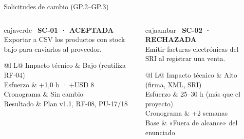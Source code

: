 \documentclass[aspectratio=169,11pt]{beamer}
\newcommand{\si}{\textcolor{verdeespe}{\ding{51}}}
\newcommand{\no}{\textcolor{rojo}{\ding{55}}}
\newcommand{\caja}[3]{\begin{beamercolorbox}[wd=\dimexpr\linewidth-12pt\relax,sep=6pt,rounded=true]{#1}#3\end{beamercolorbox}}
\begin{document}
\begin{frame}{Solicitudes de cambio (GP.2–GP.3)}
\begin{columns}[T,onlytextwidth]
\caja{cajaverde}{}{%
{\large\si}\ \textbf{SC-01 · ACEPTADA}\\[0.1cm]
\small Exportar a CSV los productos con stock bajo para enviarlos al proveedor.\\[0.15cm]
\footnotesize
\begin{tabularx}{\linewidth}{@{}l L@{}}
Impacto técnico & Bajo (reutiliza RF-04) \\
Esfuerzo & +1,0 h · +USD 8 \\
Cronograma & Sin cambio \\
Resultado & Plan v1.1, RF-08, PU-17/18 \\
\end{tabularx}}
\caja{cajaambar}{}{%
{\large\no}\ \textbf{SC-02 · RECHAZADA}\\[0.1cm]
\small Emitir facturas electrónicas del SRI al registrar una venta.\\[0.15cm]
\footnotesize
\begin{tabularx}{\linewidth}{@{}l L@{}}
Impacto técnico & Alto (firma, XML, SRI) \\
Esfuerzo & 25–30 h (más que el proyecto) \\
Cronograma & +2 semanas \\
Base & «Fuera de alcance» del enunciado \\
\end{tabularx}}
\end{columns}
\vspace{0.3cm}
\end{frame}
\end{document}
